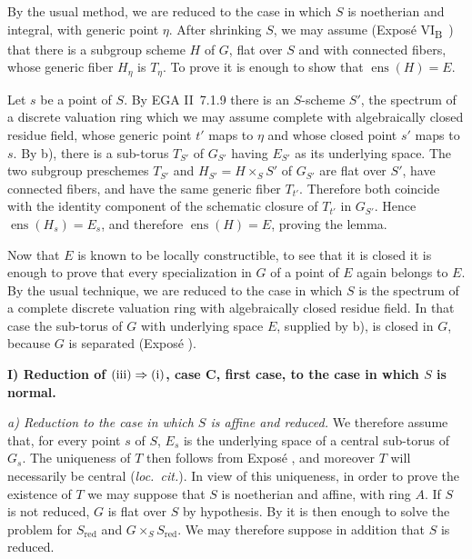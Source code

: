 By the usual method, we are reduced to the case in which \(S\) is
noetherian and integral, with generic point \(\eta\). After shrinking
\(S\), we may assume (Exposé VI\textsubscript{B}~) that there is
a subgroup scheme \(H\) of \(G\), flat over \(S\) and with connected
fibers, whose generic fiber \(H_\eta\) is \(T_\eta\). To prove  it is enough to show that \(\operatorname{ens}(H)=E\).

Let \(s\) be a point of \(S\). By EGA II~7.1.9 there is an
\(S\)-scheme \(S'\), the spectrum of a discrete valuation ring which
we may assume complete with algebraically closed residue field, whose
generic point \(t'\) maps to \(\eta\) and whose closed point \(s'\)
maps to \(s\). By \textup{ b)}, there is a sub-torus \(T_{S'}\)
of \(G_{S'}\) having \(E_{S'}\) as its underlying space. The two
subgroup preschemes \(T_{S'}\) and
\(H_{S'}=H\times_S S'\) of \(G_{S'}\) are flat over \(S'\), have
connected fibers, and have the same generic fiber \(T_{t'}\).
Therefore both coincide with the identity component of the schematic
closure of \(T_{t'}\) in \(G_{S'}\). Hence
\(\operatorname{ens}(H_s)=E_s\), and therefore
\(\operatorname{ens}(H)=E\), proving the lemma.

Now that \(E\) is known to be locally constructible, to see that it
is closed it is enough to prove that every specialization in \(G\)
of a point of \(E\) again belongs to \(E\). By the usual technique,
we are reduced to the case in which \(S\) is the spectrum of a
complete discrete valuation ring with algebraically closed residue
field. In that case the sub-torus of \(G\) with underlying space
\(E\), supplied by \textup{ b)}, is closed in \(G\), because
\(G\) is separated (Exposé ).


\noindent\textbf{I) Reduction of
\(\textup{(iii)}\Rightarrow\textup{(i)}\), case C, first case, to
the case in which \(S\) is normal.}

\smallskip
\noindent\textit{a) Reduction to the case in which \(S\) is affine
and reduced.}\quad
We therefore assume that, for every point \(s\) of \(S\), \(E_s\)
is the underlying space of a central sub-torus of \(G_s\). The
uniqueness of \(T\) then follows from Exposé , and moreover
\(T\) will necessarily be central (\emph{loc.\ cit.}). In view of
this uniqueness, in order to prove the existence of \(T\) we may
suppose that \(S\) is noetherian and affine, with ring \(A\). If
\(S\) is not reduced, \(G\) is flat over \(S\) by hypothesis. By
 it is then enough to solve the problem for \(S_{\mathrm{red}}\)
and \(G\times_S S_{\mathrm{red}}\). We may therefore suppose in
addition that \(S\) is reduced.

